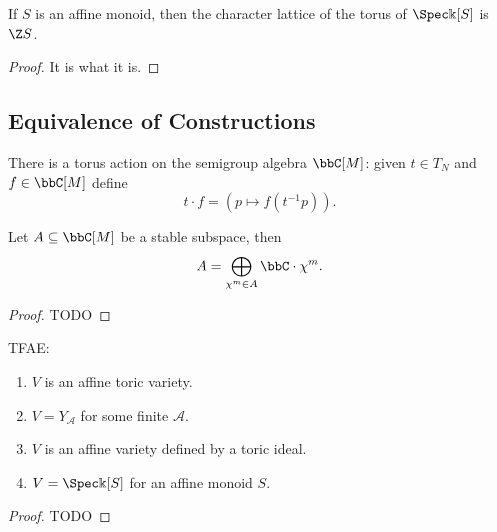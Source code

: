 \begin{proposition}
  \label{1-1-14-char-spec-aff-mon-alg}

  If $S$ is an affine monoid, then the character lattice of the torus of $\Spec \Bbbk[S]$ is $\Z S$.
\end{proposition}
\begin{proof}

  It is what it is.
\end{proof}


\subsection{Equivalence of Constructions}


\begin{definition}
  \label{1-1-tor-act-alg}

  There is a torus action on the semigroup algebra $\bbC[M]$: given $t\in T_N$ and $f\in \bbC[M]$ define
  \[
    t \cdot f = (p \mapsto f(t^{-1}p)).
  \]
\end{definition}


\begin{lemma}
  \label{1-1-16-total-red}
    Let $A \subseteq \bbC[M]$ be a stable subspace, then
    \[
      A = \bigoplus_{\chi^m \in A} \bbC \cdot \chi^m.
    \]
\end{lemma}
\begin{proof}

  TODO
\end{proof}


\begin{theorem}
  \label{thm:1-1-17}
  TFAE:
  \begin{enumerate}
    \item $V$ is an affine toric variety.
    \item $V = Y_{\mathcal A}$ for some finite $\mathcal A$.
    \item $V$ is an affine variety defined by a toric ideal.
    \item $V = \Spec \Bbbk[S]$ for an affine monoid $S$.
  \end{enumerate}
\end{theorem}
\begin{proof}

  TODO
\end{proof}

